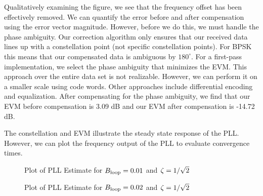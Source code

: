 \documentclass{article}
\begin{document}
\noindent Qualitatively examining the figure, we see that the frequency offset has been effectively removed. We can quantify the error before and after compensation using the error vector magnitude. However, before we do this, we must handle the phase ambiguity. Our correction algorithm only ensures that our received data lines up with a constellation point (not specific constellation points). For BPSK this means that our compensated data is ambiguous by $180^{\circ}$. For a first-pass implementation, we select the phase ambiguity that minimizes the EVM. This approach over the entire data set is not realizable. However, we can perform it on a smaller scale using code words. Other approaches include differential encoding and equalization. After compensating for the phase ambiguity, we find that our EVM before compensation is 3.09 dB and our EVM after compensation is -14.72 dB.

  The constellation and EVM illustrate the steady state response of the PLL. However, we can plot the frequency output of the PLL to evaluate convergence times.

\begin{figure}[H]
	\centerline{}
	\caption{Plot of PLL Estimate for $\protect{B_\text{loop}} = 0.01$ and $\protect{\zeta = 1/\sqrt{2}}$}
	\label{fig::convergence_Bloop_0p01_damp_sqrt_2}
\end{figure}

\begin{figure}[H]
	\centerline{}
	\caption{Plot of PLL Estimate for $\protect{B_\text{loop}} = 0.02$ and $\protect{\zeta = 1/\sqrt{2}}$}
	\label{fig::convergence_Bloop_0p02_damp_sqrt_2}
\end{figure}
\end{document}
